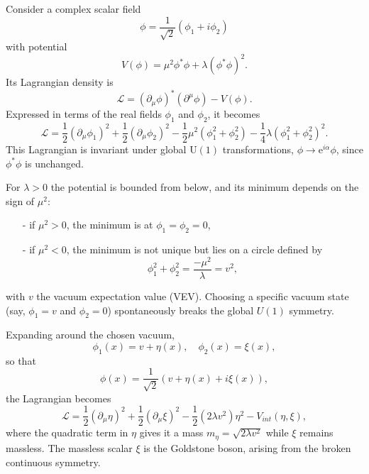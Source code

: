 Consider a complex scalar field
\begin{equation}
\phi = \frac{1}{\sqrt{2}}(\phi_1+i\phi_2)
\end{equation}
with potential
\begin{equation}
V(\phi) = \mu^2 \phi^* \phi + \lambda (\phi^*\phi)^2.
\end{equation}
Its Lagrangian density is
\begin{equation}
\mathcal{L}=(\partial_\mu \phi)^*(\partial^\mu \phi) - V(\phi).
\end{equation}
Expressed in terms of the real fields $\phi_1$ and $\phi_2$, it becomes
\begin{equation}
\mathcal{L}=\frac{1}{2}(\partial_\mu\phi_1)^2 + \frac{1}{2}(\partial_\mu \phi_2)^2 - \frac{1}{2}\mu^2 (\phi_1^2+\phi^2_2) - \frac{1}{4}\lambda (\phi_1^2+\phi_2^2)^2.
\end{equation}
This Lagrangian is invariant under global $\mathrm{U}(1)$ transformations, $\phi\to\mathrm{e}^{i\alpha}\phi$, since $\phi^*\phi$ is unchanged.

For $\lambda>0$ the potential is bounded from below, and its minimum depends on the sign of $\mu^2$:
\begin{itemize}
\item[-] if $\mu^2>0$, the minimum is at $\phi_1=\phi_2=0$,
\item[-] if $\mu^2<0$, the minimum is not unique but lies on a circle defined by
\begin{equation}
\phi_1^2+\phi_2^2=\frac{-\mu^2}{\lambda} = v^2,
\end{equation}
\end{itemize}
with $v$ the vacuum expectation value (VEV). Choosing a specific vacuum state (say, $\phi_1=v$ and $\phi_2=0$) spontaneously breaks the global $U(1)$ symmetry.

Expanding around the chosen vacuum,
\begin{equation}
\phi_1(x)=v+\eta(x), \quad \phi_2(x)=\xi(x),
\end{equation}
so that
\begin{equation}
\phi(x)=\frac{1}{\sqrt{2}} \left( v + \eta(x) + i \xi(x)\right),
\end{equation}
the Lagrangian becomes
\begin{equation}
\mathcal{L}=\frac{1}{2}(\partial_\mu\eta)^2 + \frac{1}{2}(\partial_\mu\xi)^2 - \frac{1}{2}(2\lambda v^2)\eta^2 -V_{int}(\eta,\xi),
\end{equation}
where the quadratic term in $\eta$ gives it a mass $m_\eta=\sqrt{2\lambda v^2}$ while $\xi$ remains massless. The massless scalar $\xi$ is the Goldstone boson, arising from the broken continuous symmetry.

